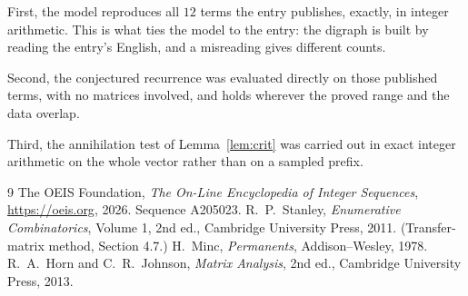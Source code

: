 \documentclass[11pt,a4paper]{article}
\theoremstyle{plain}
\theoremstyle{definition}
\begin{document}
First, the model reproduces all $12$ terms the entry publishes, exactly, in integer
arithmetic. This is what ties the model to the entry: the digraph is built by reading the
entry's English, and a misreading gives different counts.

Second, the conjectured recurrence was evaluated directly on those published terms, with no
matrices involved, and holds wherever the proved range and the data overlap.

Third, the annihilation test of Lemma~\ref{lem:crit} was carried out in exact integer
arithmetic on the whole vector rather than on a sampled prefix.

\begin{thebibliography}{9}
 The OEIS Foundation, \emph{The On-Line Encyclopedia of Integer
Sequences}, \url{https://oeis.org}, 2026. Sequence A205023.
 R.~P.~Stanley, \emph{Enumerative Combinatorics}, Volume 1, 2nd ed.,
Cambridge University Press, 2011. (Transfer-matrix method, Section 4.7.)
 H.~Minc, \emph{Permanents}, Addison--Wesley, 1978.
 R.~A.~Horn and C.~R.~Johnson, \emph{Matrix Analysis}, 2nd ed., Cambridge
University Press, 2013.
\end{thebibliography}
\end{document}
